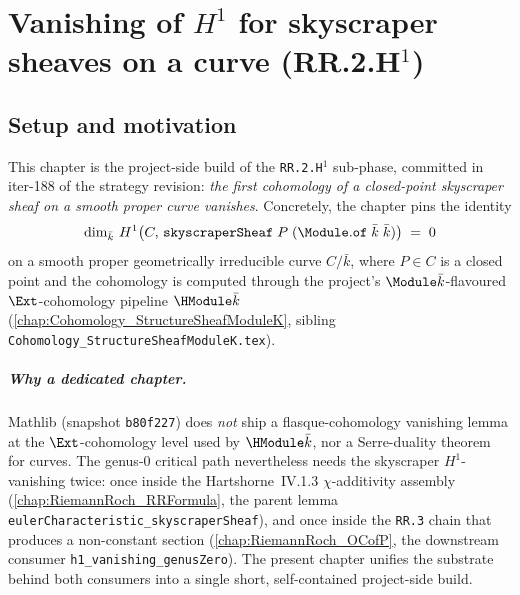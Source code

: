 
\chapter{Vanishing of \(H^1\) for skyscraper sheaves on a curve (RR.2.H\(^1\))}
\label{chap:RR_H1Vanishing}


\section{Setup and motivation}

This chapter is the project-side build of the
\texttt{RR.2.H\(^1\)} sub-phase, committed in iter-188 of the strategy
revision: \emph{the first cohomology of a closed-point skyscraper sheaf
on a smooth proper curve vanishes}. Concretely, the chapter pins the
identity
\[
  \dim_{\bar k}\, H^1\bigl(C,\, \mathtt{skyscraperSheaf}\;P\;
    (\Module.\mathtt{of}\;\bar k\;\bar k)\bigr) \;=\; 0
\]
on a smooth proper geometrically irreducible curve \(C / \bar k\), where
\(P \in C\) is a closed point and the cohomology is computed through the
project's \(\Module \bar k\)-flavoured \(\Ext\)-cohomology pipeline
\(\HModule \bar k\) (\cref{chap:Cohomology_StructureSheafModuleK}, sibling
\texttt{Cohomology\_StructureSheafModuleK.tex}).

\paragraph{Why a dedicated chapter.} Mathlib (snapshot
\texttt{b80f227}) does \emph{not} ship a flasque-cohomology vanishing
lemma at the \(\Ext\)-cohomology level used by
\(\HModule \bar k\), nor a Serre-duality theorem for curves. The
genus-\(0\) critical path nevertheless needs the skyscraper
\(H^1\)-vanishing twice: once inside the Hartshorne~IV.1.3
\(\chi\)-additivity assembly
(\cref{chap:RiemannRoch_RRFormula}, the parent lemma
\texttt{eulerCharacteristic\_skyscraperSheaf}), and once inside the
\texttt{RR.3} chain that produces a non-constant section
(\cref{chap:RiemannRoch_OCofP}, the downstream consumer
\texttt{h1\_vanishing\_genusZero}). The present chapter unifies the
substrate behind both consumers into a single short, self-contained
project-side build.

